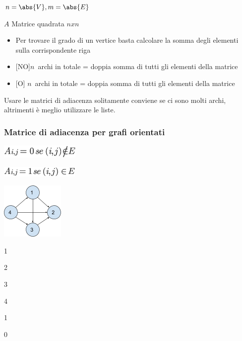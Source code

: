 \documentclass{article}
\providecommand{\tightlist}{%
  \setlength{\itemsep}{0pt}\setlength{\parskip}{0pt}}
\begin{document}
$n=\abs{V},m=\abs{E}$

{$A$ Matrice quadrata $n x n$ }

\begin{itemize}
\tightlist
\item
  {Per trovare il grado di un vertice basta calcolare la somma degli
  elementi sulla corrispondente riga}
\item
  {{[}NO{]}}$n${~archi in totale =
  doppia somma di tutti gli elementi della matrice}
\item
  {{[}O{]} }$n${~archi in totale =
  doppia somma di tutti gli elementi della matrice}
\end{itemize}

{}

{Usare le matrici di adiacenza solitamente conviene se ci sono molti
archi, altrimenti è meglio utilizzare le liste.}

\hypertarget{h.30h8k4akc7l}{\subsubsection{\texorpdfstring{{Matrice di
adiacenza per grafi
orientati}}{Matrice di adiacenza per grafi orientati}}\label{h.30h8k4akc7l}}

\includegraphics{images/image386.png}

\includegraphics{images/image387.png}

{}

\protect\hypertarget{t.baa371c993d5b7baad0f4dd74d8432f916b9230a}{}{}\protect\hypertarget{t.37}{}{}

{\includegraphics{images/image529.png}}

{}

{1}

{2}

{3}

{4}

{1}

{0}
\end{document}
